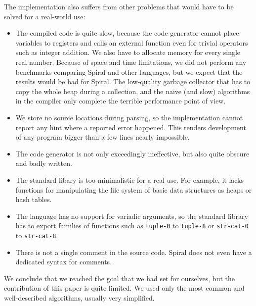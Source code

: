 The implementation also suffers from other problems that would have to be solved
for a real-world use:

\begin{itemize}
  \item The compiled code is quite slow, because the code generator cannot place
    variables to registers and calls an external function even for trivial
    operators such as integer addition. We also have to allocate memory for
    every single real number. Because of space and time limitations, we did not
    perform any benchmarks comparing Spiral and other languages, but we expect
    that the results would be bad for Spiral. The low-quality garbage collector
    that has to copy the whole heap during a collection, and the naive (and
    slow) algorithms in the compiler only complete the terrible performance
    point of view.

  \item We store no source locations during parsing, so the implementation
    cannot report any hint where a reported error happened. This renders
    development of any program bigger than a few lines nearly impossible.

  \item The code generator is not only exceedingly ineffective, but also quite
    obscure and badly written.

  \item The standard libary is too minimalistic for a real use. For example, it
    lacks functions for manipulating the file system of basic data structures as
    heaps or hash tables.

  \item The language has no support for variadic arguments, so the standard
    library has to export families of functions such as \texttt{tuple-0} to
    \texttt{tuple-8} or \texttt{str-cat-0} to \texttt{str-cat-8}.
    
  \item There is not a single comment in the source code. Spiral does not even
    have a dedicated syntax for comments.
\end{itemize}

We conclude that we reached the goal that we had set for ourselves, but the
contribution of this paper is quite limited. We used only the most common and
well-described algorithms, usually very simplified.
